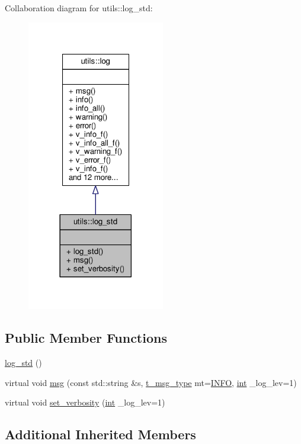 Collaboration diagram for utils\-:\-:log\-\_\-std\-:
\nopagebreak
\begin{figure}[H]
\begin{center}
\leavevmode
\includegraphics[width=170pt]{classutils_1_1log__std__coll__graph}
\end{center}
\end{figure}
\subsection*{Public Member Functions}
\begin{DoxyCompactItemize}
\item 
\hyperlink{classutils_1_1log__std_ad679600636b9335722ed81bd700407d2}{log\-\_\-std} ()
\item 
virtual void \hyperlink{classutils_1_1log__std_ac33e014ef7475b4ba4103561570dba5e}{msg} (const std\-::string \&s, \hyperlink{classutils_1_1log_a295e2ee43d4e5ade12dd5de546cb1983}{t\-\_\-msg\-\_\-type} mt=\hyperlink{classutils_1_1log_a295e2ee43d4e5ade12dd5de546cb1983a34a1a7830fae0bde90731e751a1ed9c0}{I\-N\-F\-O}, \hyperlink{classint}{int} \-\_\-log\-\_\-lev=1)
\item 
virtual void \hyperlink{classutils_1_1log__std_a8b7dc418de81361650e4033eaa98a476}{set\-\_\-verbosity} (\hyperlink{classint}{int} \-\_\-log\-\_\-lev=1)
\end{DoxyCompactItemize}
\subsection*{Additional Inherited Members}


